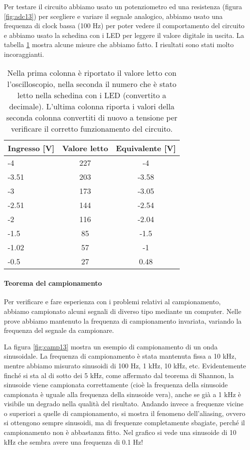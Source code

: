 Per testare il circuito abbiamo usato un potenziometro ed una resistenza (figura \ref{fig:adc13}) per scegliere
e variare il segnale analogico, abbiamo usato una frequenza di clock bassa (100 Hz) per poter vedere il comportamento
del circuito e abbiamo usato la schedina con i LED per leggere il valore digitale in uscita. La tabella \ref{tab:adc13}
mostra alcune misure che abbiamo fatto. I risultati sono stati molto incoraggianti.

\begin{table}
    \begin{tabular}{l c c}
        \toprule
        Ingresso [V] & Valore letto & Equivalente [V] \\
        \midrule
        -4    & 227 & -4 \\
        -3.51 & 203 & -3.58 \\
        -3    & 173 & -3.05 \\
        -2.51 & 144 & -2.54 \\
        -2    & 116 & -2.04 \\
        -1.5  & 85  & -1.5 \\
        -1.02 & 57  & -1 \\
        -0.5  & 27  & 0.48 \\
        \bottomrule
    \end{tabular}
    \caption{Nella prima colonna è riportato il valore letto con l'oscilloscopio,
        nella seconda il numero che è stato letto nella schedina con i LED (convertito a decimale).
        L'ultima colonna riporta i valori della seconda colonna convertiti di nuovo a tensione per verificare
    il corretto funzionamento del circuito.}
    \label{tab:adc13}
\end{table}

\paragraph{Teorema del campionamento}

Per verificare e fare esperienza con i problemi relativi al campionamento, abbiamo campionato
alcuni segnali di diverso tipo mediante un computer. Nelle prove abbiamo mantenuto la frequenza
di campionamento invariata, variando la frequenza del segnale da campionare.

La figura \ref{fig:camp13} mostra un esempio di campionamento di un onda sinusoidale. La frequenza di
campionamento è stata mantenuta fissa a 10 kHz, mentre abbiamo misurato sinusoidi di 100 Hz, 1 kHz, 10 kHz, etc.
Evidentemente finché si sta al di sotto dei 5 kHz, come affermato dal teorema di Shannon, la sinusoide viene
campionata correttamente (cioè la frequenza della sinusoide campionata è uguale alla frequenza della sinusoide vera),
anche se già a 1 kHz è visibile un degrado nella qualità del risultato. Andando invece a
frequenze vicine o superiori a quelle di campionamento, si mostra il fenomeno dell'aliasing, ovvero si ottengono
sempre sinusoidi, ma di frequenze completamente sbagiate, perché il campionamento non è abbastanza fitto.
Nel grafico si vede una sinusoide di 10 kHz che sembra avere una frequenza di 0.1 Hz!
